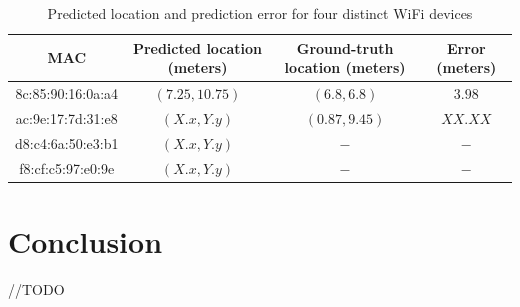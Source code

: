 \documentclass{article}
\begin{document}
\begin{center}
\begin{table}[h]
\centering
\begin{tabular}{ |c|c|c|c| } 
 \hline
 MAC & Predicted location (meters) & Ground-truth location (meters) & Error (meters) \\ 
 \hline
 8c:85:90:16:0a:a4 & $(7.25, 10.75)$ & $(6.8, 6.8)$ & $3.98$\\ 
 ac:9e:17:7d:31:e8 & $(X.x, Y.y)$ & $(0.87, 9.45)$ & $XX.XX$ \\ 
 d8:c4:6a:50:e3:b1 & $(X.x, Y.y)$ & $-$ & $-$ \\
 f8:cf:c5:97:e0:9e & $(X.x, Y.y)$ & $-$ & $-$ \\
 \hline
\end{tabular}
 \caption{Predicted location and prediction error for four distinct WiFi devices \label{tab:results}}
\end{table}
\end{center}




\section{Conclusion}
\vspace{-.3cm}
//TODO


{\scriptsize%

}
\end{document}
